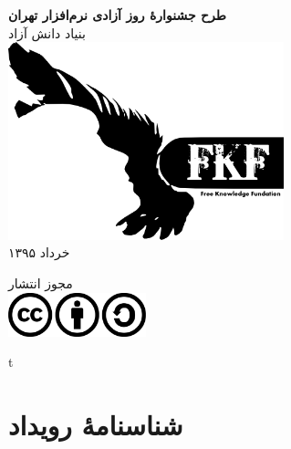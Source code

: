 \documentclass{article}
\begin{document}
\itemsep5mm \parskip2pt 

\thispagestyle{empty}

\vspace*{2cm}
\begin{center}
{\huge
\textbf{
طرح جشنوارهٔ روز آزادی نرم‌افزار تهران
}
\\[1cm]}
{\Large
بنیاد دانش آزاد
}
{\large
\\[1cm]
\baselineskip=1cm
\includegraphics[width=8cm]{images/logo.png}
\\[.4cm]
خرداد ۱۳۹۵
\\[.4cm]

}


{\large
مجوز انتشار
\\[.4cm]

\Large
\includegraphics[width=4cm]{images/cc-by-sa-license.png}

}

\end{center}


\newpage
\thispagestyle{empty}
\vspace*{\fill}
\begin{center}
\Bes
\Huge
t
\end{center}
\vspace*{\fill}


\newpage
\thispagestyle{empty}
\tableofcontents %




\newpage
\vspace*{2cm}

\section{شناسنامهٔ رویداد}
\end{document}

